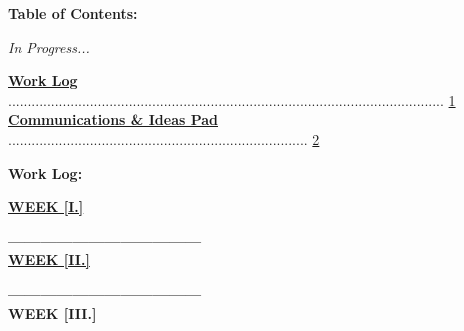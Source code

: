 \documentclass[11pt]{article}
\begin{document}
\begin{blackbox}{\begin{center}\Large\textbf{Table of Contents:}\end{center}}
\begin{center}\large\textit{In Progress...}\end{center}

\large\textbf{\hyperlink{page.1}{Work Log}} ................................................................................................................ \hyperlink{page.1}{1}\\
\large\textbf{\hyperlink{page.2}{Communications \& Ideas Pad}} ............................................................................. \hyperlink{page.2}{2}
\end{blackbox}

\begin{blackbox}{\begin{center}\Large\textbf{Work Log:}\end{center}}
\hspace{-0.3cm}\small\textbf{\hyperlink{page.3}{WEEK [I.]}}
\vspace{0.25em}

\normalsize\indent \vline\textbf{------------}\hyperlink{page.3}{}\textbf{------}\hyperlink{page.3}{}\textbf{------}\hyperlink{page.5}{}\textbf{------}\hyperlink{page.7}{}\textbf{------}\hyperlink{page.7}{} \\

\vspace{-1em}
\hspace{-0.3cm}\small\textbf{\hyperlink{page.8}{WEEK [II.]}}
\vspace{0.25em}

\normalsize\indent \vline\textbf{------------}\textbf{------}\hyperlink{page.8}{}\textbf{------}\hyperlink{page.10}{}\textbf{------}\hyperlink{page.11}{}\textbf{------} \\

\vspace{-1em}
\hspace{-0.3cm}\small\textbf{WEEK [III.]}
\vspace{0.25em}


\end{blackbox}
\end{document}

